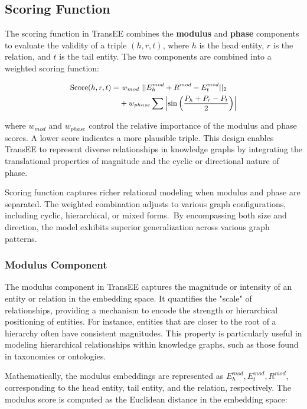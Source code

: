 \documentclass[11pt]{article}
\begin{document}
{\subsection{Scoring Function}
The scoring function in TransEE combines the \textbf{modulus} and \textbf{phase} components to evaluate the validity of a triple \((h, r, t)\), where \(h\) is the head entity, \(r\) is the relation, and \(t\) is the tail entity. The two components are combined into a weighted scoring function:

\begin{equation*} \small \begin{aligned} \text{Score}(h, r, t) = &\ w_{mod} \ ||E_h^{mod} + R^{mod} - E_t^{mod}||_2 \\ &+ w_{phase} \sum \left| \sin\left(\frac{P_h + P_r - P_t}{2}\right) \right| \end{aligned} \end{equation*}





where \(w_{mod}\) and \(w_{phase}\) control the relative importance of the modulus and phase scores. A lower score indicates a more plausible triple. This design enables TransEE to represent diverse relationships in knowledge graphs by integrating the translational properties of magnitude and the cyclic or directional nature of phase.

Scoring function captures richer relational modeling when modulus and phase are separated. The weighted combination adjusts to various graph configurations, including cyclic, hierarchical, or mixed forms. By encompassing both size and direction, the model exhibits superior generalization across various graph patterns.

\subsubsection{Modulus Component}

The modulus component in TransEE captures the magnitude or intensity of an entity or relation in the embedding space. It quantifies the "scale" of relationships, providing a mechanism to encode the strength or hierarchical positioning of entities. For instance, entities that are closer to the root of a hierarchy often have consistent magnitudes. This property is particularly useful in modeling hierarchical relationships within knowledge graphs, such as those found in taxonomies or ontologies.

Mathematically, the modulus embeddings are represented as \( E_h^{mod}, E_t^{mod}, R^{mod} \), corresponding to the head entity, tail entity, and the relation, respectively. The modulus score is computed as the Euclidean distance in the embedding space:

}
\end{document}
